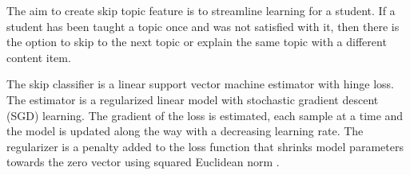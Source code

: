 The aim to create skip topic feature is to streamline learning for a student. If a student has been taught a topic once and was not satisfied with it, then there is the option to skip to the next topic or explain the same topic with a different content item. \par

The skip classifier is a linear support vector machine estimator with hinge loss. The estimator is a regularized linear model with stochastic gradient descent (SGD) learning. The gradient of the loss is estimated, each sample at a time and the model is updated along the way with a decreasing learning rate. The regularizer is a penalty added to the loss function that shrinks model parameters towards the zero vector using squared Euclidean norm \cite{scikit-learn}. \par